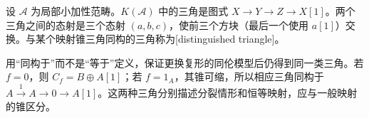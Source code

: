 \begin{definition}\label{b4:def:good-cone-triangle}
设 \(\mathcal A\) 为局部小加性范畴。\(K(\mathcal A)\) 中的三角是图式 \(X\to Y\to Z\to X[1]\)。两个三角之间的态射是三个态射 \((a,b,c)\)，使前三个方块（最后一个使用 \(a[1]\)）交换。与某个映射锥三角同构的三角称为[distinguished triangle]。
\end{definition}

用“同构于”而不是“等于”定义，保证更换复形的同伦模型后仍得到同一类三角。若 \(f=0\)，则 \(C_f=B\oplus A[1]\)；若 \(f=1_A\)，其锥可缩，所以相应三角同构于 \(A\xrightarrow{1}A\to0\to A[1]\)。这两种三角分别描述分裂情形和恒等映射，应与一般映射的锥区分。
